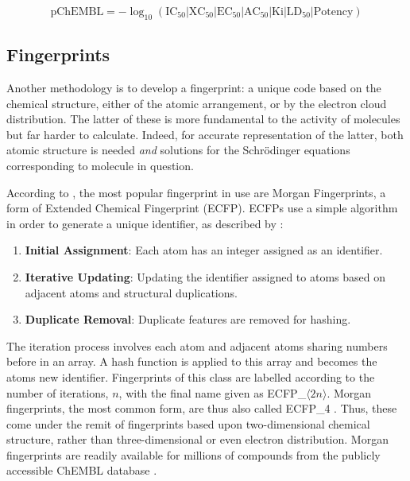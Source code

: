 \begin{equation}
    \label{eq:pChEMBL}
    \mathrm{pChEMBL}=-\log_{10}{\left(\mathrm{IC_{50}}|\mathrm{XC_{50}}|\mathrm{EC_{50}}|\mathrm{AC_{50}}|\mathrm{Ki}|\mathrm{LD_{50}}|\mathrm{Potency}\right)}
\end{equation}

\subsection{Fingerprints}
Another methodology is to develop a fingerprint: a unique code based on the chemical structure, either of the atomic arrangement, or by the electron cloud distribution. The latter of these is more fundamental to the activity of molecules but far harder to calculate. Indeed, for accurate representation of the latter, both atomic structure is needed \textit{and} solutions for the Schrödinger equations corresponding to molecule in question.

According to \textcite{Cap20}, the most popular fingerprint in use are Morgan Fingerprints, a form of Extended Chemical Fingerprint (ECFP). ECFPs use a simple algorithm in order to generate a unique identifier, as described by \textcite{Mor2020}:

\begin{enumerate}
    \item \textbf{Initial Assignment}: Each atom has an integer assigned as an identifier.
    \item \textbf{Iterative Updating}: Updating the identifier assigned to atoms based on adjacent atoms and structural duplications.
    \item \textbf{Duplicate Removal}: Duplicate features are removed for hashing.
\end{enumerate}

The iteration process involves each atom and adjacent atoms sharing numbers before in an array. A hash function is applied to this array and becomes the atoms new identifier. Fingerprints of this class are labelled according to the number of iterations, $n$, with the final name given as ECFP\_$\langle{}2n\rangle{}$. Morgan fingerprints, the most common form, are thus also called ECFP\_4 \cite{Cap20, Mor2020}. Thus, these come under the remit of fingerprints based upon two-dimensional chemical structure, rather than three-dimensional or even electron distribution. Morgan fingerprints are readily available for millions of compounds from the publicly accessible ChEMBL database \cite{CHEMBL}.

